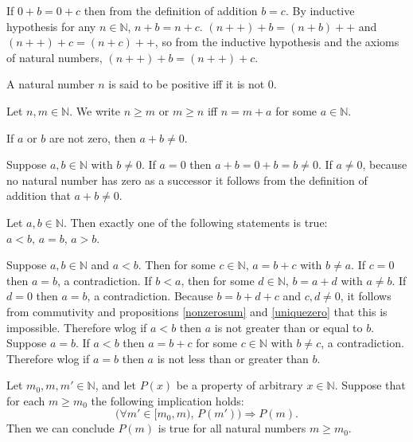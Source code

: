 \documentclass{article}
\begin{document}
	\begin{IEEEproof}
		If \(0+b=0+c\) then from the definition of addition \(b=c\). By inductive hypothesis for any \(n\in\mathbb{N}\), \(n+b=n+c\). \((n++)+b=(n+b)++\) and \((n++)+c=(n+c)++\), so from the inductive hypothesis and the axioms of natural numbers, \((n++)+b=(n++)+c\).
	\end{IEEEproof}
\begin{definition}
	A natural number \(n\) is said to be positive iff it is not \(0\).
\end{definition}
\begin{definition}
	Let \(n,m\in\mathbb{N}\). We write \(n\geq m\) or \(m\geq n\) iff \(n=m+a\) for some \(a\in\mathbb{N}\).
\end{definition}
\begin{proposition}
	\label{nonzerosum}
	If \(a\) or \(b\) are not zero, then \(a+b\neq 0\).
\end{proposition}
	\begin{IEEEproof}
		Suppose \(a,b\in\mathbb{N}\) with \(b\neq 0\). If \(a=0\) then \(a+b=0+b=b\neq 0\). If \(a\neq 0\), because no natural number has zero as a successor it follows from the definition of addition that \(a+b\neq 0\).
	\end{IEEEproof}
\begin{proposition}
	Let \(a,b\in\mathbb{N}\). Then exactly one of the following statements is true: \(a<b,\,a=b,\,a>b\).
\end{proposition}
	\begin{IEEEproof}
		Suppose \(a,b\in\mathbb{N}\) and \(a<b\). Then for some \(c\in\mathbb{N}\), \(a=b+c\) with \(b\neq a\). If \(c=0\) then \(a=b\), a contradiction. If \(b<a\), then for some \(d\in\mathbb{N}\), \(b=a+d\) with \(a\neq b\). If \(d=0\) then \(a=b\), a contradiction. Because \(b=b+d+c\) and \(c,d\neq 0\), it follows from commutivity and propositions \ref{nonzerosum} and \ref{uniquezero} that this is impossible. Therefore wlog if \(a<b\) then \(a\) is not greater than or equal to \(b\).
	Suppose \(a=b\). If \(a<b\) then \(a=b+c\) for some \(c\in\mathbb{N}\) with \(b\neq c\), a contradiction. Therefore wlog if \(a=b\) then \(a\) is not less than or greater than \(b\).
	\end{IEEEproof}
\begin{proposition}
	Let \(m_0,m,m'\in\mathbb{N}\), and let \(P(x)\) be a property of arbitrary \(x\in\mathbb{N}\). Suppose that for each \(m\geq m_0\) the following implication holds:
	\begin{equation*}
		\bigg(\forall m'\in[m_0,m),\,P(m')\bigg)\Rightarrow P(m).
	\end{equation*}
	Then we can conclude \(P(m)\) is true for all natural numbers \(m\geq m_0\).
\end{proposition}
\end{document}
